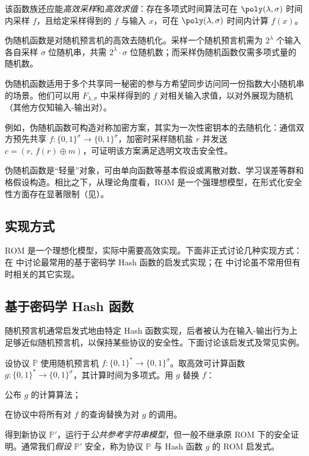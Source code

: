 \documentclass[american,singlepageview]{snargs-book-zh}
\newcommand{\DoQuote}[1]{``#1''}
\newcommand{\Bits}{\{0,1\}}
\newcommand{\ROFunction}{f}
\newcommand{\ROQuery}{x}
\newcommand{\ROInputSize}{\lambda}
\newcommand{\ROOutputSize}{\sigma}
\newcommand{\ROProtocol}{\mathbb{P}}
\newcommand{\CHFunction}{g}
\begin{document}
该函数族还应能\emph{高效采样}和\emph{高效求值}：存在多项式时间算法可在 $\poly(\ROInputSize,\ROOutputSize)$ 时间内采样 $f$，且给定采样得到的 $f$ 与输入 $\ROQuery$，可在 $\poly(\ROInputSize,\ROOutputSize)$ 时间内计算 $f(\ROQuery)$。

伪随机函数是对随机预言机的高效去随机化。采样一个随机预言机需为 $2^{\ROInputSize}$ 个输入各自采样 $\ROOutputSize$ 位随机串，共需 $2^{\ROInputSize}\cdot\ROOutputSize$ 位随机数；而采样伪随机函数仅需多项式量的随机数。

伪随机函数适用于多个共享同一秘密的参与方希望同步访问同一份指数大小随机串的场景。他们可以用 $F_{\ROInputSize,\ROOutputSize}$ 中采样得到的 $f$ 对相关输入求值，以对外展现为随机（其他方仅知输入-输出对）。

例如，伪随机函数可构造对称加密方案，其实为一次性密钥本的去随机化：通信双方预先共享 $f\colon\Bits^{\ROOutputSize}\to\Bits^{\ROOutputSize}$，加密时采样随机盐 $r$ 并发送 $c=(r,\,f(r)\oplus m)$，可证明该方案满足选明文攻击安全性。

伪随机函数是\DoQuote{轻量}对象，可由单向函数等基本假设或离散对数、学习误差等群和格假设构造。相比之下，从理论角度看，ROM 是一个强理想模型，在形式化安全性方面存在显著限制（见）。

\subsection{实现方式}
\label{section:rom-realizations}

ROM 是一个理想化模型，实际中需要高效实现。下面非正式讨论几种实现方式：在 中讨论最常用的基于密码学 Hash 函数的启发式实现；在 中讨论虽不常用但有时相关的其它实现。

\subsection{基于密码学 Hash 函数}
\label{section:rom-as-concrete-hash}

随机预言机通常启发式地由特定 Hash 函数实现，后者被认为在输入-输出行为上足够近似随机预言机，以保持某些协议的安全性。下面讨论该启发式及常见实例。

设协议 $\ROProtocol$ 使用随机预言机 $\ROFunction\colon\Bits^{*}\to\Bits^{\ROOutputSize}$。取高效可计算函数 $\CHFunction\colon\Bits^{*}\to\Bits^{\ROOutputSize}$，其计算时间为多项式。用 $\CHFunction$ 替换 $\ROFunction$：
\begin{inparaenum}[(1)]
  \item 公布 $\CHFunction$ 的计算算法；
  \item 在协议中将所有对 $\ROFunction$ 的查询替换为对 $\CHFunction$ 的调用。
\end{inparaenum}
得到新协议 $\ROProtocol'$，运行于\emph{公共参考字符串模型}，但一般不继承原 ROM 下的安全证明。通常我们\emph{假设} $\ROProtocol'$ 安全，称为协议 $\ROProtocol$ 与 Hash 函数 $\CHFunction$ 的 ROM 启发式。
\end{document}
